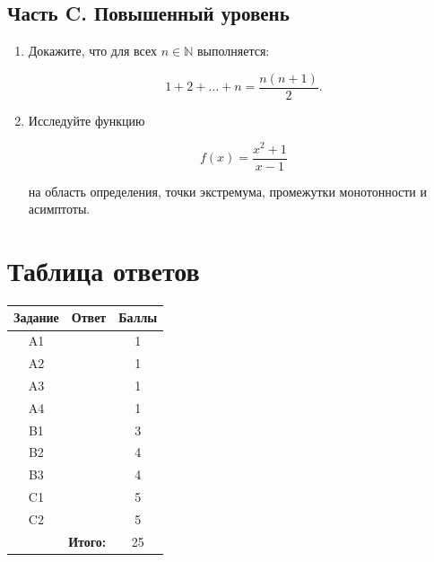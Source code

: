 \documentclass[12pt,a4paper]{article}
\theoremstyle{definition}
\theoremstyle{remark}
\newcommand{\N}{\mathbb{N}}
\begin{document}
\subsection*{Часть C. Повышенный уровень}

\begin{enumerate}[label=\textbf{C\arabic*.}]
    \item Докажите, что для всех $n\in\N$ выполняется:

    \[
        1+2+\dots+n
        =
        \frac{n(n+1)}{2}.
    \]

    \vspace{35mm}

    \item Исследуйте функцию

    \[
        f(x)
        =
        \frac{x^2+1}{x-1}
    \]

    на область определения, точки экстремума, промежутки монотонности
    и асимптоты.

    \vspace{40mm}
\end{enumerate}


\section{Таблица ответов}

\begin{table}[H]
    \centering
    \renewcommand{\arraystretch}{2}

    \begin{tabularx}{\textwidth}{|c|X|c|}
        \hline
        \textbf{Задание} &
        \textbf{Ответ} &
        \textbf{Баллы}\\
        \hline
        A1 & & 1\\
        \hline
        A2 & & 1\\
        \hline
        A3 & & 1\\
        \hline
        A4 & & 1\\
        \hline
        B1 & & 3\\
        \hline
        B2 & & 4\\
        \hline
        B3 & & 4\\
        \hline
        C1 & & 5\\
        \hline
        C2 & & 5\\
        \hline
        \multicolumn{2}{|r|}{\textbf{Итого:}} & 25\\
        \hline
    \end{tabularx}
\end{table}
\end{document}
